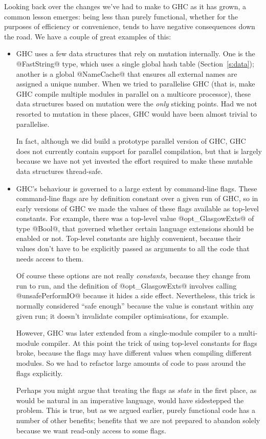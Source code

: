 \documentclass{article}
\begin{document}
Looking back over the changes we've had to make to GHC as it has
grown, a common lesson emerges: being less than purely functional,
whether for the purposes of efficiency or convenience, tends to have
negative consequences down the road.  We have a couple of great
examples of this:

\begin{itemize}
\item GHC uses a few data structures that rely on mutation internally.
  One is the @FastString@ type, which uses a single global hash table
  (Section~\ref{s:data}); another is a global @NameCache@ that ensures
  all external names are assigned a unique number.  When we tried to
  parallelise GHC (that is, make GHC compile multiple modules in
  parallel on a multicore processor), these data structures based on
  mutation were the \emph{only} sticking points.  Had we not resorted
  to mutation in these places, GHC would have been almost trivial to
  parallelise.

  In fact, although we did build a prototype parallel version of GHC,
  GHC does not currently contain support for parallel compilation, but
  that is largely because we have not yet invested the effort required
  to make these mutable data structures thread-safe.

\item GHC's behaviour is governed to a large extent by command-line
  flags.  These command-line flags are by definition constant over a
  given run of GHC, so in early versions of GHC we made the values of
  these flags available as top-level constants. For example, there was
  a top-level value @opt_GlasgowExts@ of type @Bool@, that governed
  whether certain language extensions should be enabled or not.
  Top-level constants are highly convenient, because their values
  don't have to be explicitly passed as arguments to all the code that
  needs access to them.

  Of course these options are not really \emph{constants}, because
  they change from run to run, and the definition of @opt_GlasgowExts@
  involves calling @unsafePerformIO@ because it hides a side effect.
  Nevertheless, this trick is normally considered ``safe enough''
  because the value is constant within any given run; it doesn't
  invalidate compiler optimisations, for example.

  However, GHC was later extended from a single-module compiler to a
  multi-module compiler.  At this point the trick of using top-level
  constants for flags broke, because the flags may have different
  values when compiling different modules.  So we had to refactor
  large amounts of code to pass around the flags explicitly.

  Perhaps you might argue that treating the flags as \emph{state} in
  the first place, as would be natural in an imperative language,
  would have sidestepped the problem.  This is true, but as we argued
  earlier, purely functional code has a number of other benefits;
  benefits that we are not prepared to abandon solely because we want
  read-only access to some flags.
\end{itemize}
\end{document}
